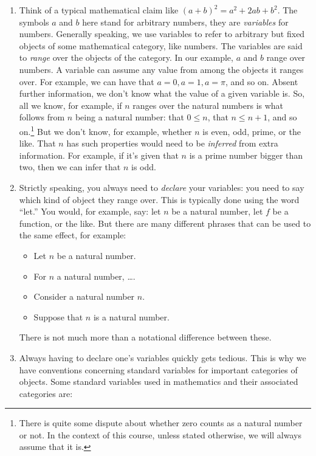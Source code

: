 \begin{enumerate}[{\thesection}.1]
		\item Think of a typical mathematical claim like $(a+b)^2=a^2+2ab+b^2$. The symbols $a$ and $b$ here stand for arbitrary numbers, they are \emph{variables} for numbers. Generally speaking, we use variables to refer to arbitrary but fixed objects of some mathematical category, like numbers. The variables are said to \emph{range} over the objects of the category. In our example, $a$ and $b$ range over numbers. A variable can assume any value from among the objects it ranges over. For example, we can have that $a=0, a=1, a=\pi$, and so on. Absent further information, we don't know what the value of a given variable is. So, all we know, for example, if $n$ ranges over the natural numbers is what follows from $n$ being a natural number: that $0\leq n$, that $n\leq n+1$, and so on.\footnote{There is quite some dispute about whether zero counts as a natural number or not. In the context of this course, unless stated otherwise, we will always assume that it is.} But we don't know, for example, whether $n$ is even, odd, prime, or the like. That $n$ has such properties would need to be \emph{inferred} from extra information. For example, if it's given that $n$ is a prime number bigger than two, then we can infer that $n$ is odd.
		
		\item Strictly speaking, you always need to \emph{declare} your variables: you need to say which kind of object they range over. This is typically done using the word ``let.'' You would, for example, say: let $n$ be a natural number, let $f$ be a function, or the like. But there are many different phrases that can be used to the same effect, for example:
			\begin{itemize} 
			
				\item Let $n$ be a natural number. 
							
				\item For $n$ a natural number, \dots.
				
				\item Consider a natural number $n$.
				
				\item Suppose that $n$ is a natural number. 
			
			\end{itemize}
			There is not much more than a notational difference between these.
		
		
		\item Always having to declare one's variables quickly gets tedious. This is why we have conventions concerning standard variables for important categories of objects. Some standard variables used in mathematics and their associated categories are:
		

\end{enumerate}
